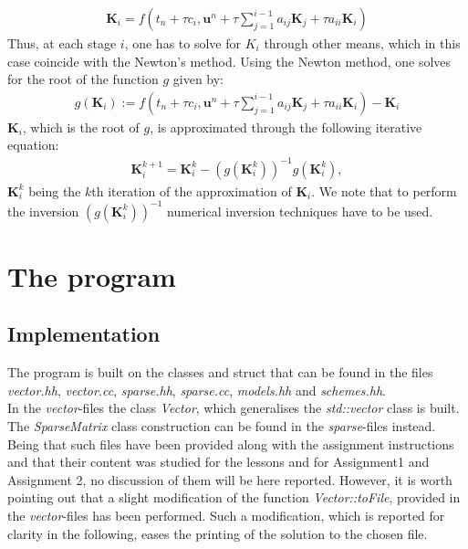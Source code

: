 \documentclass[11pt]{article}
\theoremstyle{theorem}
\theoremstyle{definition}
\begin{document}
\begin{align}
\label{eqn:K_i}
\mathbf{K}_i = f\left(t_n + \tau c_i, \mathbf{u}^n + \tau\sum_{j=1}^{i-1}a_{ij}\mathbf{K}_j + \tau a_{ii}\mathbf{K}_i\right)
\end{align}
Thus, at each stage $ i $, one has to solve for $ K_i $ through other means, which in this case coincide with the Newton's method. Using the Newton method, one solves for the root of the function $ g $ given by:
\begin{align*}
g(\mathbf{K}_i) := f\left(t_n + \tau c_i, \mathbf{u}^n + \tau\sum_{j=1}^{i-1}a_{ij}\mathbf{K}_j + \tau a_{ii}\mathbf{K}_i\right) - \mathbf{K}_i
\end{align*}
$\mathbf{K}_i $, which is the root of $g$, is approximated through the following iterative equation:
\begin{align*}
\mathbf{K}_i^{k+1} = \mathbf{K}_i^{k} - (g(\mathbf{K}_{i}^{k}))^{-1}g(\mathbf{K}_{i}^{k}),
\end{align*}
$ \mathbf{K}_i^k $ being the $ k $th iteration of the approximation of $ \mathbf{K}_i $. We note that to perform the inversion $ (g(\mathbf{K}_{i}^{k}))^{-1} $ numerical inversion techniques have to be used.\\



\section{The program}
\subsection{Implementation}
The program is built on the classes and struct that can be found in the files \emph{vector.hh}, \emph{vector.cc}, \emph{sparse.hh}, \emph{sparse.cc}, \emph{models.hh} and \emph{schemes.hh}.\\
In the \emph{vector}-files the class \emph{Vector}, which generalises the \emph{std::vector} class is built. The \emph{SparseMatrix} class construction can be found in the \emph{sparse}-files instead. Being that such files have been provided along with the assignment instructions and that their content was studied for the lessons and for Assignment1 and Assignment 2, no discussion of them will be here reported. However, it is worth pointing out that a slight modification of the function \emph{Vector::toFile}, provided in the \emph{vector}-files has been performed. Such a modification, which is reported for clarity in the following, eases the printing of the solution to the chosen file.\\
\end{document}
